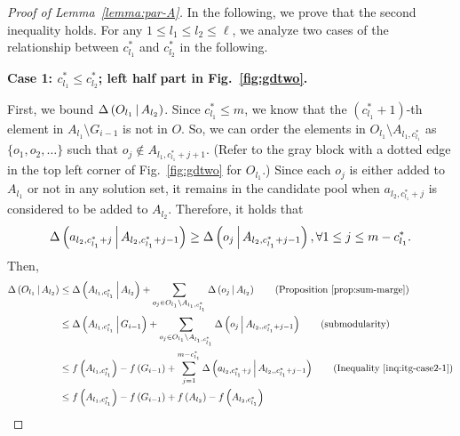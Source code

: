\begin{proof}[Proof of Lemma~\ref{lemma:par-A}]
In the following, we prove that the second inequality holds.
For any $1\le l_1\le l_2\le \ell$,
we analyze two cases of the relationship between $c_{l_1}^* $ and $ c_{l_2}^*$ in the following.


\textbf{Case 1: $c_{l_1}^* \le c_{l_2}^*$; left half part in Fig.~\ref{fig:gdtwo}.}

First, we bound $\Delta \left( O_{l_1} \, \middle| \, A_{l_2} \right)$.
Since $c_{l_1}^* \le m$, we know that the $(c_{l_1}^*+1)$-th element in $A_{l_1}\setminus G_{i-1}$ is not in $O$.
So, we can order the elements in $O_{l_1}\setminus A_{l_1, c_{l_1}^*}$ as $\{o_1, o_2, \ldots\}$ such that $o_j \not \in A_{l_1, c_{l_1}^*+j+1}$.
(Refer to the gray block with a dotted edge in the top left corner of Fig.~\ref{fig:gdtwo} for $O_{l_1}$.)
Since each $o_j$ is either added to $A_{l_1}$ or not in any solution set,
it remains in the candidate pool when $a_{l_2, c_{l_1}^*+j}$ is considered to be added to $A_{l_2}$.
Therefore, it holds that 
\begin{equation}\label{inq:itg-case2-1}
\Delta \left( a_{l_2, c_{l_1}^*+j} \, \middle| \, A_{l_2, c_{l_1}^*+j-1} \right) \ge \Delta \left( o_j \, \middle| \, A_{l_2, c_{l_1}^*+j-1} \right), \forall 1\le j\le m-c_{l_1}^*.
\end{equation}
Then,
\begin{align*}
\marge{O_{l_1}}{A_{l_2}} &\le \marge{A_{l_1, c_{l_1}^*}}{A_{l_2}}  + \sum_{o_j \in O_{l_1}\setminus A_{l_1, c_{l_1}^*}}\marge{o_j}{A_{l_2}} \tag{Proposition~\ref{prop:sum-marge}}\\
&\le \marge{A_{l_1, c_{l_1}^*}}{G_{i-1}} + \sum_{o_j \in O_{l_1}\setminus A_{l_1, c_{l_1}^*}}\marge{o_j}{A_{l_2, , c_{l_1}^*+j-1}} \tag{submodularity}\\
&\le \ff{A_{l_1, c_{l_1}^*}}-\ff{G_{i-1}} + \sum_{j = 1}^{m-c_{l_1}^*}\marge{a_{l_2, c_{l_1}^*+j}}{A_{l_2, , c_{l_1}^*+j-1}} \tag{Inequality~\eqref{inq:itg-case2-1}}\\
& \le \ff{A_{l_1, c_{l_1}^*}}-\ff{G_{i-1}} + \ff{A_{l_2}} - \ff{A_{l_2, c_{l_1}^*}} 
\end{align*}


\end{proof}

